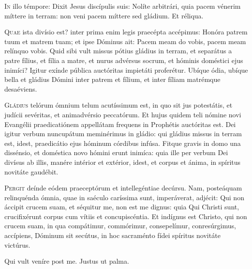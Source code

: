 \horaNocturnusIII



\lettrine{I}{n} illo témpore:
Dixit Jesus discípulis suis:
Nolíte arbitrári, quia pacem vénerim míttere in terram:
non veni pacem míttere sed gládium.
Et réliqua.


\lettrine{Q}{uae} ista divísio est?
inter prima enim legis praecépta accépimus:
Honóra patrem tuum et matrem tuam;
et ipse Dóminus ait:
Pacem meam do vobis, pacem meam relínquo vobis.
Quid sibi vult missus pótius gládius in terram,
et separátus a patre fílius, et fília a matre,
et nurus advérsus socrum, et hóminis doméstici ejus inimíci?
Igitur exínde pública auctóritas impietáti proferétur.
Ubíque ódia, ubíque bella et gládius Dómini inter patrem et fílium,
et inter fíliam matrémque desaéviens.



\lettrine{G}{ládius} telórum ómnium telum acutíssimum est,
in quo sit jus potestátis, et judícii sevéritas,
et animadvérsio peccatórum.
Et hujus quidem teli nómine novi Evangélii praedicatiónem
appellátam frequens in Prophétis auctóritas est.
Dei igitur verbum nuncupátum meminérimus in gládio:
qui gládius missus in terram est, idest,
praedicátio ejus hóminum córdibus infúsa.
Fitque gravis in domo una dissénsio,
et doméstica novo hómini erunt inimíca:
quia ille per verbum Dei divísus ab illis,
manére intérior et extérior, idest,
et corpus et ánima, in spíritus novitáte gaudébit.


\lettrine{P}{ergit} deínde eódem praeceptórum et intellegéntiae
decúrsu. Nam, posteáquam relinquénda ómnia,
quae in saéculo caríssima sunt, imperáverat, adjécit:
Qui non áccipit crucem suam, et séquitur me, non est me dignus:
quia Qui Christi sunt, crucifixérunt corpus cum vítiis
et concupiscéntia.
Et indígnus est Christo, qui non crucem suam, in qua compátimur,
commórimur, consepelímur, conresúrgimus, accípiens,
Dóminum sit secútus, in hoc sacraménto fídei spíritus novitáte
victúrus.

\parsTeDeum

Qui vult veníre post me.
Justus ut palma.
